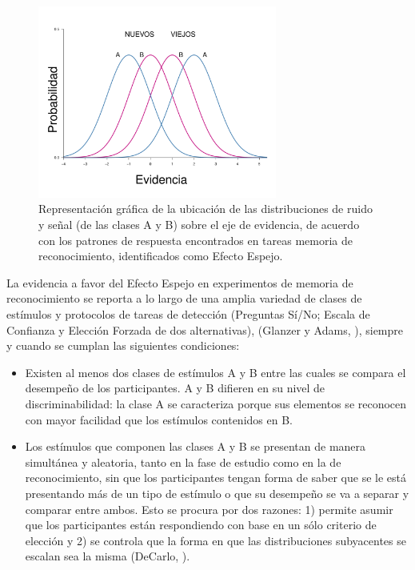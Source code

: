\begin{figure}[h]
\centering
\includegraphics[width=0.7\textwidth]{Figures/EfectoEspejo}
\caption[Efecto Espejo: Las distribuciones de ruido y señal A y B se reflejan entre sí]{Representación gráfica de la ubicación de las distribuciones de ruido y señal (de las clases A y B) sobre el eje de evidencia, de acuerdo con los patrones de respuesta encontrados en tareas memoria de reconocimiento, identificados como Efecto Espejo.}
\label{fig:Ejem_EfectoEspejo}
\end{figure}

La evidencia a favor del Efecto Espejo en experimentos de memoria de reconocimiento se reporta a lo largo de una amplia variedad de clases de estímulos y protocolos de tareas de detección (Preguntas Sí/No; Escala de Confianza y Elección Forzada de dos alternativas), (Glanzer y Adams, \citeyear{Glanzer1990}), siempre y cuando se cumplan las siguientes condiciones:\\

\begin{itemize}
\item Existen al menos dos clases de estímulos A y B entre las cuales se compara el desempeño de los participantes. A y B difieren en su nivel de discriminabilidad: la clase A se caracteriza porque sus elementos se reconocen con mayor facilidad que los estímulos contenidos en B.\\

\item Los estímulos que componen las clases A y B se presentan de manera simultánea y aleatoria, tanto en la fase de estudio como en la de reconocimiento, sin que los participantes tengan forma de saber que se le está presentando más de un tipo de estímulo o que su desempeño se va a separar y comparar entre ambos. Esto se procura por dos razones: 1) permite asumir que los participantes están respondiendo con base en un sólo criterio de elección y 2) se controla que la forma en que las distribuciones subyacentes se escalan sea la misma (DeCarlo, \citeyear{DeCarlo2007}).\\
\end{itemize}

